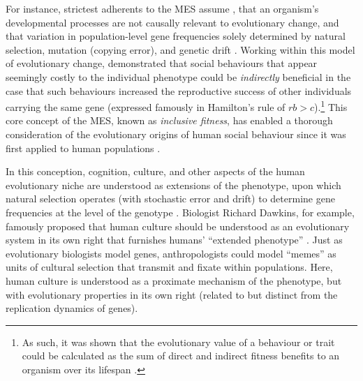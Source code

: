\begin{CJK}{UTF8}{gbsn}
For instance, strictest adherents to the MES assume \citep[e.g., via the ``phenotypic gambit''][]{Grafen1984}, that an organism's developmental processes are not causally relevant to evolutionary change, and that variation in population-level gene frequencies  solely determined by natural selection, mutation (copying error), and genetic drift \citep{Grafen1991}.  Working within this model of evolutionary change, \textcite{Hamilton1964} demonstrated that social behaviours that appear seemingly costly to the individual phenotype could be \textit{indirectly} beneficial in the case that such behaviours increased the reproductive success of other individuals carrying the same gene (expressed famously in Hamilton's rule of $rb > c$).\footnote{As such, it was shown that the evolutionary value of a behaviour or trait could be calculated as the sum of direct and indirect fitness benefits to an organism over its lifespan \citep{Grafen2006}.} This core concept of the MES, known as \textit{inclusive fitness}, has enabled a thorough consideration of the evolutionary origins of human social behaviour since it was first applied to human populations \citep{Axelrod1981,West2011}.

In this conception, cognition, culture, and other aspects of the human evolutionary niche are understood as extensions of the phenotype, upon which natural selection operates (with stochastic error and drift) to determine gene frequencies at the level of the genotype \citep{Dawkins1976}.  Biologist Richard Dawkins, for example, famously proposed that human culture should be understood as an evolutionary system in its own right that furnishes humans' ``extended phenotype'' \citep{Dawkins1982}.  Just as evolutionary biologists model genes, anthropologists could model ``memes'' as units of cultural selection that transmit and fixate within populations. Here, human culture is understood as a proximate mechanism of the phenotype, but with evolutionary properties in its own right (related to but distinct from the replication dynamics of genes).


\end{CJK}
